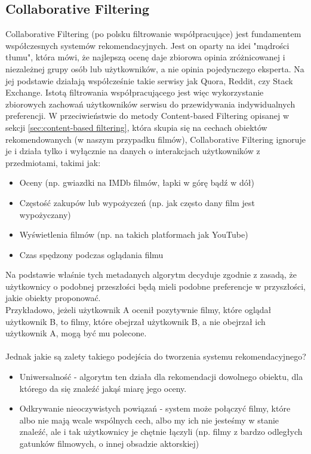 \documentclass{article}
\begin{document}
\subsection{Collaborative Filtering}
Collaborative Filtering (po polsku filtrowanie współpracujące) jest fundamentem współczesnych systemów rekomendacyjnych. Jest on oparty na idei "mądrości tłumu", która mówi, że najlepszą ocenę daje zbiorowa opinia zróżnicowanej i niezależnej grupy osób lub użytkowników, a nie opinia pojedynczego eksperta. Na jej podstawie działają współcześnie takie serwisy jak Quora, Reddit, czy Stack Exchange. Istotą filtrowania współpracującego jest więc wykorzystanie zbiorowych zachowań użytkowników serwisu do przewidywania indywidualnych preferencji. W przeciwieństwie do metody Content-based Filtering opisanej w sekcji \ref{sec:content-based filtering}, która skupia się na cechach obiektów rekomendowanych (w naszym przypadku filmów), Collaborative Filtering ignoruje je i działa tylko i wyłącznie na danych o interakcjach użytkowników z przedmiotami, takimi jak:
\begin{itemize}
    \item Oceny (np. gwiazdki na IMDb filmów, łapki w górę bądź w dół)
    \item Częstość zakupów lub wypożyczeń (np. jak często dany film jest wypożyczany)
    \item Wyświetlenia filmów (np. na takich platformach jak YouTube)
    \item Czas spędzony podczas oglądania filmu
\end{itemize}
Na podstawie właśnie tych metadanych algorytm decyduje zgodnie z zasadą, że użytkownicy o podobnej przeszłości będą mieli podobne preferencje w przyszłości, jakie obiekty proponować.\\
Przykładowo, jeżeli użytkownik A ocenił pozytywnie filmy, które oglądał użytkownik B, to filmy, które obejrzał użytkownik B, a nie obejrzał ich użytkownik A, mogą być mu polecone.\\\\
Jednak jakie są zalety takiego podejścia do tworzenia systemu rekomendacyjnego?
\begin{itemize}
    \item Uniwersalność - algorytm ten działa dla rekomendacji dowolnego obiektu, dla którego da się znaleźć jakąś miarę jego oceny.
    \item Odkrywanie nieoczywistych powiązań - system może połączyć filmy, które albo nie mają wcale wspólnych cech, albo my ich nie jesteśmy w stanie znaleźć, ale i tak użytkownicy je chętnie łączyli (np. filmy z bardzo odległych gatunków filmowych, o innej obsadzie aktorskiej)
\end{itemize}
\end{document}
